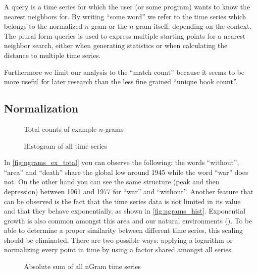 \begin{definition}[Query]
    A query is a time series for which the user (or some program) wants to know the nearest neighbors for. By writing \enquote{some word} we refer to the time series which belongs to the normalized $n$-gram or the $n$-gram itself, depending on the context. The plural form queries is used to express multiple starting points for a nearest neighbor search, either when generating statistics or when calculating the distance to multiple time series.
\end{definition}

Furthermore we limit our analysis to the \enquote{match count} because it seems to be more useful for later research than the less fine grained \enquote{unique book count}.


\subsection{Normalization}
\label{ssec:baseline:sim:norm}

\begin{figure}
    \centering
    
    \caption{Total counts of example $n$-grams}\label{fig:ngrams_ex_total}
\end{figure}

\begin{figure}
    \centering
    
    \caption{Histogram of all time series}\label{fig:ngrams_hist}
\end{figure}

In \autoref{fig:ngrams_ex_total} you can observe the following: the words \enquote{without}, \enquote{area} and \enquote{death} share the global low around 1945 while the word \enquote{war} does not. On the other hand you can see the same structure (peak and then depression) between 1961 and 1977 for \enquote{war} and \enquote{without}. Another feature that can be observed is the fact that the time series data is not limited in its value and that they behave exponentially, as shown in \autoref{fig:ngrams_hist}. Exponential growth is also common amongst this area and our natural environments (\cite{exp_growth1,exp_growth2}). To be able to determine a proper similarity between different time series, this scaling should be eliminated. There are two possible ways: applying a logarithm or normalizing every point in time by using a factor shared amongst all series.

\begin{figure}
    \centering
    
    \caption{Absolute sum of all nGram time series}\label{fig:ngrams_sums}
\end{figure}

